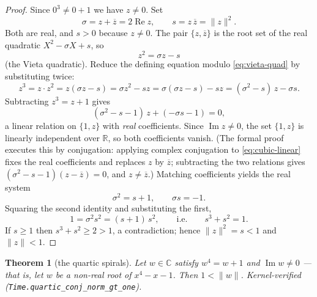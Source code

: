 \documentclass[11pt]{amsart}
\theoremstyle{plain}
\newtheorem{theorem}{Theorem}[section]
\theoremstyle{definition}
\theoremstyle{remark}
\begin{document}
\begin{proof}
Since $0^3 \neq 0 + 1$ we have $z \neq 0$. Set
\[
\sigma = z + \overline{z} = 2\operatorname{Re} z, \qquad s = z\,\overline{z} = \lVert z \rVert^2 .
\]
Both are real, and $s > 0$ because $z \neq 0$. The pair $\{z, \overline{z}\}$ is the root set of the real quadratic $X^2 - \sigma X + s$, so
\begin{equation}\label{eq:vieta-quad}
z^2 = \sigma z - s
\end{equation}
(the Vieta quadratic). Reduce the defining equation modulo \eqref{eq:vieta-quad} by substituting twice:
\[
z^3 = z \cdot z^2 = z(\sigma z - s) = \sigma z^2 - s z = \sigma(\sigma z - s) - s z = (\sigma^2 - s)\, z - \sigma s .
\]
Subtracting $z^3 = z + 1$ gives
\begin{equation}\label{eq:cubic-linear}
(\sigma^2 - s - 1)\, z + (-\sigma s - 1) = 0 ,
\end{equation}
a linear relation on $\{1, z\}$ with \emph{real} coefficients. Since $\operatorname{Im} z \neq 0$, the set $\{1, z\}$ is linearly independent over $\mathbb{R}$, so both coefficients vanish. (The formal proof executes this by conjugation: applying complex conjugation to \eqref{eq:cubic-linear} fixes the real coefficients and replaces $z$ by $\overline{z}$; subtracting the two relations gives $(\sigma^2 - s - 1)(z - \overline{z}) = 0$, and $z \neq \overline{z}$.) Matching coefficients yields the real system
\begin{equation}\label{eq:cubic-system}
\sigma^2 = s + 1, \qquad \sigma s = -1 .
\end{equation}
Squaring the second identity and substituting the first,
\[
1 = \sigma^2 s^2 = (s + 1)\, s^2, \qquad \text{i.e.} \qquad s^3 + s^2 = 1 .
\]
If $s \geq 1$ then $s^3 + s^2 \geq 2 > 1$, a contradiction; hence $\lVert z \rVert^2 = s < 1$ and $\lVert z \rVert < 1$.
\end{proof}

\begin{theorem}[the quartic spirals]\label{thm:quartic-outside}
Let $w \in \mathbb{C}$ satisfy $w^4 = w + 1$ and $\operatorname{Im} w \neq 0$ --- that is, let $w$ be a non-real root of $x^4 - x - 1$. Then $1 < \lVert w \rVert$. Kernel-verified (\texttt{Time.quartic\_conj\_norm\_gt\_one}).
\end{theorem}
\end{document}
